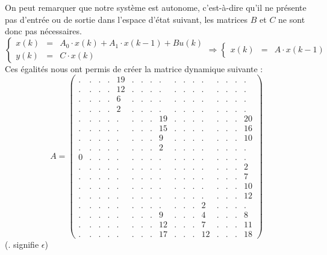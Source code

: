 On peut remarquer que notre système est autonome, c'est-à-dire qu'il ne présente pas d'entrée ou de sortie 
dans l'espace d'état suivant, les matrices $B$ et $C$ ne sont donc pas nécessaires.
\begin{equation}
\left\lbrace
\begin{array}{lcl}
	x(k) &=& A_0 \cdot x(k) + A_1 \cdot x(k-1) + B u(k)\\
	y(k) &=& C \cdot x(k)
\end{array}
\right. \Rightarrow
\left\lbrace\begin{array}{lcl}
	x(k) &=& A \cdot x(k-1)
\end{array}\right.
\end{equation}
Ces égalités nous ont permis de créer la matrice dynamique suivante : 
\begin{equation}
A = \left(\begin{array}{ccccccccccccccccc}
.&.&.&.&19&.&.&.&.& .&.&.&.& .&.&.&. \\
.&.&.&.&12&.&.&.&.& .&.&.&.& .&.&.&. \\
.&.&.&.&6& .&.&.&.& .&.&.&.& .&.&.&. \\
.&.&.&.&2& .&.&.&.& .&.&.&.& .&.&.&. \\
.&.&.&.&.& .&.&.&19&.&.&.&.& .&.&.&20\\
.&.&.&.&.& .&.&.&15&.&.&.&.& .&.&.&16\\
.&.&.&.&.& .&.&.&9& .&.&.&.& .&.&.&10\\
.&.&.&.&.& .&.&.&2& .&.&.&.& .&.&.&.\\
0&.&.&.&.& .&.&.&.& .&.&.&.& .&.&.&. \\
.&.&.&.&.& .&.&.&.& .&.&.&.& .&.&.&2 \\
.&.&.&.&.& .&.&.&.& .&.&.&.& .&.&.&7 \\
.&.&.&.&.& .&.&.&.& .&.&.&.& .&.&.&10\\
.&.&.&.&.& .&.&.&.& .&.&.&.& .&.&.&12\\
.&.&.&.&.& .&.&.&.& .&.&.&2& .&.&.&. \\
.&.&.&.&.& .&.&.&9& .&.&.&4& .&.&.&8 \\
.&.&.&.&.& .&.&.&12&.&.&.&7& .&.&.&11\\
.&.&.&.&.& .&.&.&17&.&.&.&12&.&.&.&18
\end{array}\right)
\end{equation}
($.$ signifie $\epsilon$)
